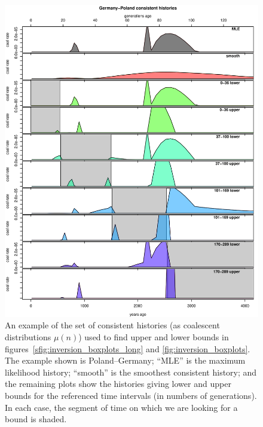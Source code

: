 \documentclass{article}
\begin{document}
\begin{figure}[!htp]
  \begin{center}
    \includegraphics{example-inversion-bounds}
    \caption{
    An example of the set of consistent histories (as coalescent distributions $\mu(n)$)
    used to find upper and lower bounds
    in figures~\ref{sfig:inversion_boxplots_long} and \ref{fig:inversion_boxplots}.
    The example shown is Poland--Germany;
    ``MLE'' is the maximum likelihood history;
    ``smooth'' is the smoothest consistent history;
    and the remaining plots show the histories giving lower and upper bounds
    for the referenced time intervals (in numbers of generations).
    In each case, the segment of time on which we are looking for a bound is shaded.
    \label{sfig:example_inversion_bounds}
    }
  \end{center}
\end{figure}
\end{document}
